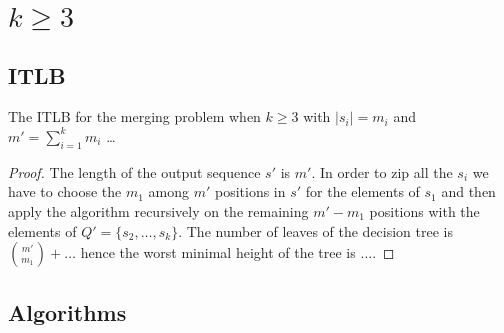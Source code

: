 \section{$k\geq3$}
\label{tree:merging:kgeq3}


\subsection{ITLB}
\label{tree:merging:kgeq3:ITLB}


\begin{theorem}
The ITLB for the merging problem when $k \geq 3$ with $|s_i| = m_i$ and $m' = \sum_{i=1}^{k} m_i$ \dots
\end{theorem}

\begin{proof}
The length of the output sequence $s'$ is $m'$. In order to zip all the $s_i$ we have to choose the $m_1$ among $m'$ positions in $s'$ for the elements of $s_1$ and then apply the algorithm recursively on the remaining $m'-m_1$ positions with the elements of $Q' = \{s_2, \dots, s_k\}$. The number of leaves of the decision tree is $\binom{m'}{m_1} + \dots$ hence the worst minimal height of the tree is $\dots$.
\end{proof}



\subsection{Algorithms}
\label{tree:merging:kgeq3:alg}